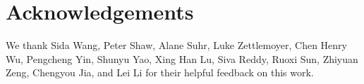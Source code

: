 \section*{Acknowledgements}
We thank Sida Wang, Peter Shaw, Alane Suhr, Luke Zettlemoyer, Chen Henry Wu, Pengcheng Yin, Shunyu Yao, Xing Han Lu, Siva Reddy, Ruoxi Sun, Zhiyuan Zeng, Chengyou Jia, and Lei Li for their helpful feedback on this work. 